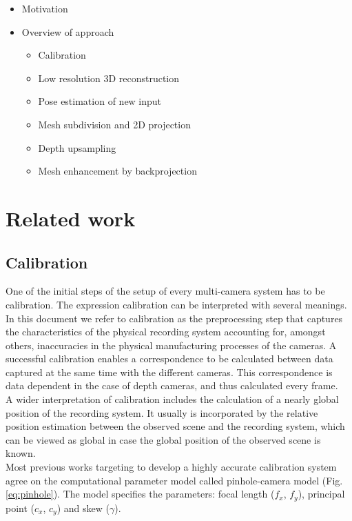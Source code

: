 \documentclass{ucl_thesis}
\newcommand{\figref}[1]{(Fig. \ref{#1})}
\begin{document}
\label{chp:background}
	\begin{itemize}	
		\item Motivation
		\item Overview of approach
		\begin{itemize}
			\item Calibration
			\item Low resolution 3D reconstruction
			\item Pose estimation of new input
			\item Mesh subdivision and 2D projection
			\item Depth upsampling
			\item Mesh enhancement by backprojection
		\end{itemize}
	\end{itemize}

\chapter{Related work} 
\label{chp:related_work}

\section{Calibration}
\label{sec:lit_calib}

One of the initial steps of the setup of every multi-camera system has to be calibration. The expression calibration can be interpreted with several meanings. In this document we refer to calibration as the preprocessing step that captures the characteristics of the physical recording system accounting for, amongst others, inaccuracies in the physical manufacturing processes of the cameras. A successful calibration enables a correspondence to be calculated between data captured at the same time with the different cameras. This correspondence is data dependent in the case of depth cameras, and thus calculated every frame.\\

A wider interpretation of calibration includes the calculation of a nearly global position of the recording system. It usually is incorporated by the relative position estimation between the observed scene and the recording system, which can be viewed as global in case the global position of the observed scene is known. \\

Most previous works targeting to develop a highly accurate calibration system agree on the computational parameter model called pinhole-camera model \figref{eq:pinhole}. The model specifies the parameters: focal length ($f_x$, $f_y$), principal point ($c_x$, $c_y$) and skew ($\gamma$).
\end{document}
